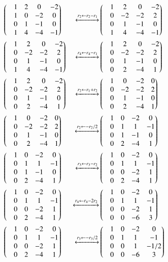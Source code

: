 \documentclass[journal,12pt,twocolumn]{IEEEtran}
\begin{document}
\begin{align}
 & \begin{pmatrix}&1 &2 & 0 &-2 \\ &1 &0 &-2 & 0 \\ &0 &1 &-1 &0 \\&1 &4 &-4 &-1\end{pmatrix} &\xleftrightarrow[]{r_2 \leftarrow r_2 - r_1} &\begin{pmatrix}&1 &2 &0 &-2 \\ &0 &-2 &-2 &2 \\ &0 &1 &-1 &0 \\&1 &4 &-4 &-1\end{pmatrix} \\
 & \begin{pmatrix}&1 &2 &0 &-2 \\ &0 &-2 &-2 &2 \\ &0 &1 &-1 &0 \\&1 &4 &-4 &-1\end{pmatrix} &\xleftrightarrow[]{r_4 \leftarrow r_4 - r_1}&\begin{pmatrix}&1 &2 &0 &-2 \\ &0 &-2 &-2 &2 \\ &0 &1 &-1 &0 \\&0 &2 &-4 &1\end{pmatrix} \\
 & \begin{pmatrix}&1 &2 &0 &-2 \\ &0 &-2 &-2 &2 \\ &0 &1 &-1 &0 \\&0 &2 &-4 &1\end{pmatrix} &\xleftrightarrow[]{r_2 \leftarrow r_1 + r_2} &\begin{pmatrix}&1 &0 &-2 &0 \\ &0 &-2 &-2 &2 \\ &0 &1 &-1 &0 \\&0 &2 &-4 &1\end{pmatrix} \\
 & \begin{pmatrix}&1 &0 &-2 &0 \\ &0 &-2 &-2 &2 \\ &0 &1 &-1 &0 \\&0 &2 &-4 &1\end{pmatrix} &\xleftrightarrow[]{r_2 \leftarrow -r_2/2 } &\begin{pmatrix}&1 &0 &-2 &0 \\ &0 &1 &1 &-1 \\ &0 &1 &-1 &0 \\&0 &2 &-4 &1\end{pmatrix} \\
 & \begin{pmatrix}&1 &0 &-2 &0 \\ &0 &1 &1 &-1 \\ &0 &1 &-1 &0 \\&0 &2 &-4 &1\end{pmatrix}  &\xleftrightarrow[]{r_3 \leftarrow r_3 - r_2 } &\begin{pmatrix}&1 &0 &-2 &0 \\ &0 &1 &1 &-1 \\ &0 &0 &-2 &1 \\&0 &2 &-4 &1\end{pmatrix}\\
 &\begin{pmatrix}&1 &0 &-2 &0 \\ &0 &1 &1 &-1 \\ &0 &0 &-2 &1 \\&0 &2 &-4 &1\end{pmatrix} 
 &\xleftrightarrow[]{r_4 \leftarrow r_4 - 2r_2 } &\begin{pmatrix}&1 &0 &-2 &0 \\ &0 &1 &1 &-1 \\ &0 &0 &-2 &1 \\&0 &0 &-6 &3\end{pmatrix} \\
 &\begin{pmatrix}&1 &0 &-2 &0 \\ &0 &1 &1 &-1 \\ &0 &0 &-2 &1 \\&0 &2 &-4 &1\end{pmatrix} 
 &\xleftrightarrow[]{r_3 \leftarrow -r_3/2 } &\begin{pmatrix}&1 &0 &-2 &0 \\ &0 &1 &1 &-1 \\ &0 &0 &1 &-1/2 \\&0 &0 &-6 &3\end{pmatrix}
\end{align}
\end{document}
